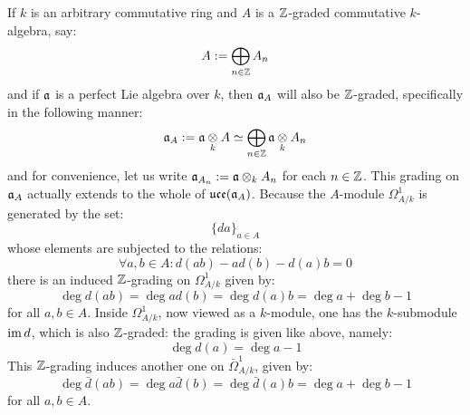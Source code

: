         \begin{example}
            
        \end{example}
        \begin{remark} \label{remark: Z_gradings_on_toroidal_lie_algebras}
            If $k$ is an arbitrary commutative ring and $A$ is a $\mathbb{Z}$-graded commutative $k$-algebra, say:
                $$A := \bigoplus_{n \in \mathbb{Z}} A_n$$
            and if $\mathfrak{a}$ is a perfect Lie algebra over $k$, then $\mathfrak{a}_A$ will also be $\mathbb{Z}$-graded, specifically in the following manner:
                $$\a_A := \a \tensor_k A \cong \bigoplus_{n \in \Z} \a \tensor_k A_n$$
            and for convenience, let us write $\a_{A_n} := \a \tensor_k A_n$ for each $n \in \mathbb{Z}$. This grading on $\mathfrak{a}_A$ actually extends to the whole of $\mathfrak{uce}(\mathfrak{a}_A)$. Because the $A$-module $\Omega^1_{A/k}$ is generated by the set:
                $$\{da\}_{a \in A}$$
            whose elements are subjected to the relations:
                $$\forall a, b \in A: d(ab) - a d(b) - d(a) b = 0$$
           there is an induced $\mathbb{Z}$-grading on $\Omega^1_{A/k}$ given by:
                $$\deg d(ab) = \deg a d(b) = \deg d(a) b = \deg a + \deg b - 1$$
            for all $a, b \in A$. Inside $\Omega^1_{A/k}$, now viewed as a $k$-module, one has the $k$-submodule $\operatorname{im} d$, which is also $\mathbb{Z}$-graded: the grading is given like above, namely:
                $$\deg d(a) = \deg a - 1$$
            This $\mathbb{Z}$-grading induces another one on $\bar{\Omega}^1_{A/k}$, given by:
                $$\deg \bar{d}(ab) = \deg a \bar{d}(b) = \deg \bar{d}(a) b = \deg a + \deg b - 1$$
            for all $a, b \in A$.


\end{remark}
